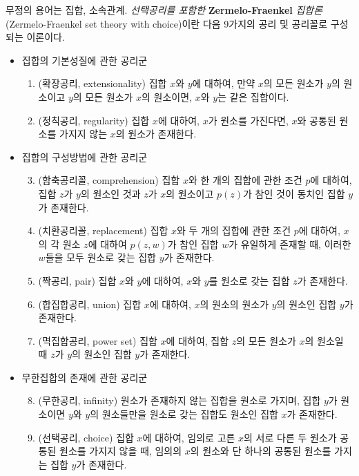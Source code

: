 \documentclass{../../large}
\begin{document}
\begin{axiom*}
무정의 용어는 집합, 소속관계.
\emph{선택공리를 포함한 }\textbf{Zermelo-Fraenkel}\emph{ 집합론}(Zermelo-Fraenkel set theory with choice)이란 다음 9가지의 공리 및 공리꼴로 구성되는 이론이다.

\begin{itemize}
\item 집합의 기본성질에 관한 공리군
\begin{enumerate}
\item (확장공리, extensionality)
집합 $x$와 $y$에 대하여, 만약 $x$의 모든 원소가 $y$의 원소이고 $y$의 모든 원소가 $x$의 원소이면, $x$와 $y$는 같은 집합이다.
\item (정칙공리, regularity)
집합 $x$에 대하여, $x$가 원소를 가진다면, $x$와 공통된 원소를 가지지 않는 $x$의 원소가 존재한다.
\end{enumerate}
\item 집합의 구성방법에 관한 공리군
\begin{enumerate}
\setcounter{enumi}{2}
\item (함축공리꼴, comprehension)
집합 $x$와 한 개의 집합에 관한 조건 $p$에 대하여, 집합 $z$가 $y$의 원소인 것과 $z$가 $x$의 원소이고 $p(z)$가 참인 것이 동치인 집합 $y$가 존재한다.
\item (치환공리꼴, replacement)
집합 $x$와 두 개의 집합에 관한 조건 $p$에 대하여, $x$의 각 원소 $z$에 대하여 $p(z,w)$가 참인 집합 $w$가 유일하게 존재할 때, 이러한 $w$들을 모두 원소로 갖는 집합 $y$가 존재한다.
\item (짝공리, pair)
집합 $x$와 $y$에 대하여, $x$와 $y$를 원소로 갖는 집합 $z$가 존재한다.
\item (합집합공리, union)
집합 $x$에 대하여, $x$의 원소의 원소가 $y$의 원소인 집합 $y$가 존재한다.
\item (멱집합공리, power set)
집합 $x$에 대하여, 집합 $z$의 모든 원소가 $x$의 원소일 때 $z$가 $y$의 원소인 집합 $y$가 존재한다.
\end{enumerate}
\item 무한집합의 존재에 관한 공리군
\begin{enumerate}
\setcounter{enumi}{7}
\item (무한공리, infinity)
원소가 존재하지 않는 집합을 원소로 가지며, 집합 $y$가 원소이면 $y$와 $y$의 원소들만을 원소로 갖는 집합도 원소인 집합 $x$가 존재한다.
\item (선택공리, choice)
집합 $x$에 대하여, 임의로 고른 $x$의 서로 다른 두 원소가 공통된 원소를 가지지 않을 때, 임의의 $x$의 원소와 단 하나의 공통된 원소를 가지는 집합 $y$가 존재한다.
\end{enumerate}
\end{itemize}
\end{axiom*}
\end{document}
